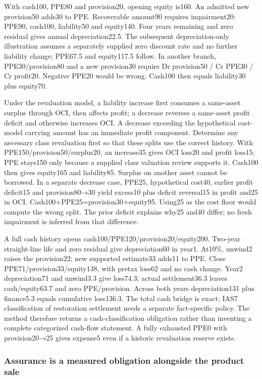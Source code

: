 With cash100, PPE80 and provision20, opening equity is160. An admitted new provision50 adds30 to PPE. Recoverable amount90 requires impairment20: PPE90, cash100, liability50 and equity140. Four years remaining and zero residual gives annual depreciation22.5. The subsequent depreciation-only illustration assumes a separately supplied zero discount rate and no further liability change; PPE67.5 and equity117.5 follow. In another branch, PPE30/provision80 and a new provision30 require Dr provision50 / Cr PPE30 / Cr profit20. Negative PPE20 would be wrong. Cash100 then equals liability30 plus equity70.

Under the revaluation model, a liability increase first consumes a same-asset surplus through OCI, then affects profit; a decrease reverses a same-asset profit deficit and otherwise increases OCI. A decrease exceeding the hypothetical cost-model carrying amount has an immediate profit component. Determine any necessary class revaluation first so that these splits use the correct history. With PPE150/provision50/surplus20, an increase35 gives OCI loss20 and profit loss15; PPE stays150 only because a supplied class valuation review supports it. Cash100 then gives equity165 and liability85. Surplus on another asset cannot be borrowed. In a separate decrease case, PPE25, hypothetical cost40, earlier profit deficit15 and provision80→30 yield excess10 plus deficit reversal15 in profit and25 in OCI. Cash100+PPE25=provision30+equity95. Using25 as the cost floor would compute the wrong split. The prior deficit explains why25 and40 differ; no fresh impairment is inferred from that difference.

A full cash history opens cash100/PPE120/provision20/equity200. Two-year straight-line life and zero residual give depreciation60 in year1. At10\%, unwind2 raises the provision22; new supported estimate33 adds11 to PPE. Close PPE71/provision33/equity138, with pretax loss62 and no cash change. Year2 depreciation71 and unwind3.3 give loss74.3; actual settlement36.3 leaves cash/equity63.7 and zero PPE/provision. Across both years depreciation131 plus finance5.3 equals cumulative loss136.3. The total cash bridge is exact; IAS7 classification of restoration settlement needs a separate fact-specific policy. The method therefore returns a cash-classification obligation rather than inventing a complete categorized cash-flow statement. A fully exhausted PPE0 with provision20→25 gives expense5 even if a historic revaluation reserve exists.

\hypertarget{assurance-is-a-measured-obligation-alongside-the-product-sale}{%
\subsubsection{Assurance is a measured obligation alongside the product sale}\label{assurance-is-a-measured-obligation-alongside-the-product-sale}}

